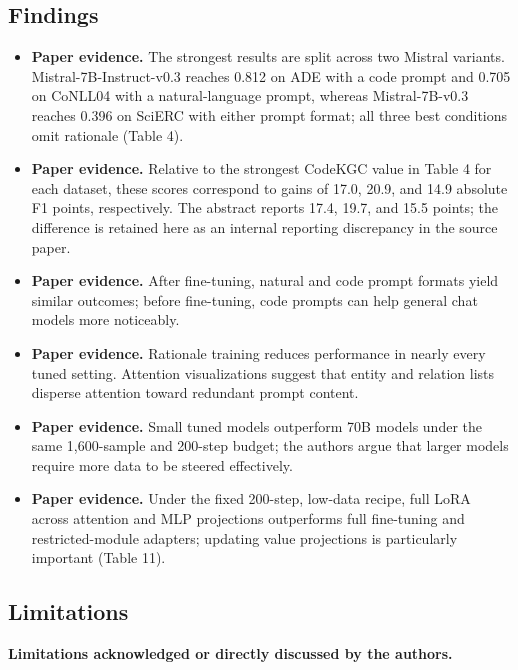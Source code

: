 \documentclass[11pt]{article}
\begin{document}
\subsection{Findings}\label{findings-3}

\begin{itemize}
\item
  \textbf{Paper evidence.} The strongest results are split across two
  Mistral variants. Mistral-7B-Instruct-v0.3 reaches 0.812 on ADE with a
  code prompt and 0.705 on CoNLL04 with a natural-language prompt,
  whereas Mistral-7B-v0.3 reaches 0.396 on SciERC with either prompt
  format; all three best conditions omit rationale (Table 4).
\item
  \textbf{Paper evidence.} Relative to the strongest CodeKGC value in
  Table 4 for each dataset, these scores correspond to gains of 17.0,
  20.9, and 14.9 absolute F1 points, respectively. The abstract reports
  17.4, 19.7, and 15.5 points; the difference is retained here as an
  internal reporting discrepancy in the source paper.
\item
  \textbf{Paper evidence.} After fine-tuning, natural and code prompt formats yield
  similar outcomes; before fine-tuning, code prompts can help general
  chat models more noticeably.
\item
  \textbf{Paper evidence.} Rationale training reduces performance in nearly every tuned
  setting. Attention visualizations suggest that entity and relation
  lists disperse attention toward redundant prompt content.
\item
  \textbf{Paper evidence.} Small tuned models outperform 70B models under the same
  1,600-sample and 200-step budget; the authors argue that larger models
  require more data to be steered effectively.
\item
  \textbf{Paper evidence.} Under the fixed 200-step, low-data recipe,
  full LoRA across attention and MLP projections outperforms full
  fine-tuning and restricted-module adapters; updating value projections
  is particularly important (Table 11).
\end{itemize}

\subsection{Limitations}\label{limitations-3}

\textbf{Limitations acknowledged or directly discussed by the authors.}
\end{document}
